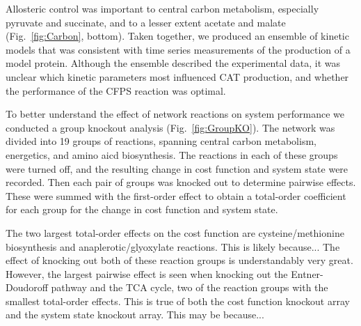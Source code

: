 \documentclass[12pt]{article}
\begin{document}
Allosteric control was important to central carbon metabolism, especially pyruvate and succinate, and to a lesser extent acetate and malate (Fig.~\ref{fig:Carbon}, bottom).
Taken together, we produced an ensemble of kinetic models that was consistent with time series measurements of the production of a model protein.
Although the ensemble described the experimental data, it was unclear which kinetic parameters most influenced CAT production, and whether the performance of the CFPS reaction was optimal.

To better understand the effect of network reactions on system performance we conducted a group knockout analysis (Fig.~\ref{fig:GroupKO}).
The network was divided into 19 groups of reactions, spanning central carbon metabolism, energetics, and amino aicd biosynthesis.
The reactions in each of these groups were turned off, and the resulting change in cost function and system state were recorded.
Then each pair of groups was knocked out to determine pairwise effects.
These were summed with the first-order effect to obtain a total-order coefficient for each group for the change in cost function and system state.


The two largest total-order effects on the cost function are cysteine/methionine biosynthesis and anaplerotic/glyoxylate reactions.
This is likely because...
The effect of knocking out both of these reaction groups is understandably very great.
However, the largest pairwise effect is seen when knocking out the Entner-Doudoroff pathway and the TCA cycle, two of the reaction groups with the smallest total-order effects.
This is true of both the cost function knockout array and the system state knockout array.
This may be because...
\end{document}
